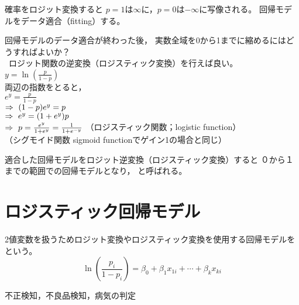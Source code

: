 \MyFrame{}
{
  確率をロジット変換すると
  $p=1$は$\infty$に，$p=0$は$-\infty$に写像される。
  回帰モデルをデータ適合（fitting）する。
}

\MyFrame{}
{
  回帰モデルのデータ適合が終わった後，
  実数全域を0から1までに縮めるにはどうすればよいか？\\
  \ra~ロジット関数の逆変換（ロジスティック変換）を行えば良い。\\
  $y=\ln \left(\frac{p}{1-p}\right)$\\
  両辺の指数をとると，\\
  $e^y=\frac{p}{1-p}$\\
  $\Rightarrow~(1-p)e^y=p$\\
  $\Rightarrow~e^y=(1+e^y)p$\\
  $\Rightarrow~p=\frac{e^y}{1+e^y}=\frac{1}{1+e^{-y}}$
  （ロジスティック関数；logistic function）\\
  （シグモイド関数 sigmoid functionでゲイン1の場合と同じ）

}

\MyFrame{}
{
  適合した回帰モデルをロジット逆変換（ロジスティック変換）すると
  ０から１までの範囲での回帰モデルとなり，
  と呼ばれる。
}

\section{ロジスティック回帰モデル}

\MyFrame{\insertsection}
{
  {
    2値変数を扱うためロジット変換やロジスティック変換を使用する回帰モデルを
    という。
    \[\ln\left(\frac{p_i}{1-p_i}\right)
      =\beta_0 + \beta_1 x_{1i}+\cdots+\beta_k x_{ki}\]
  }
}

\MyFrame{\insertsection}
{
  {
    不正検知，不良品検知，病気の判定 
  }
}


